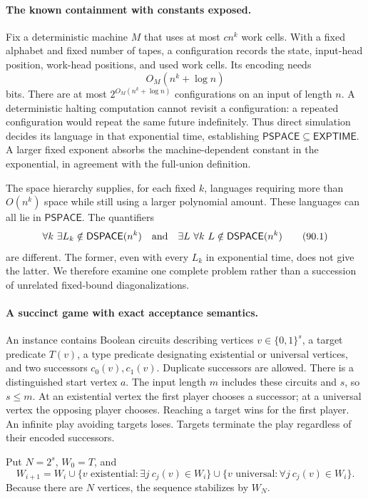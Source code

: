 \documentclass[11pt]{article}
\begin{document}
\paragraph{The known containment with constants exposed.}
Fix a deterministic machine $M$ that uses at most $c n^k$ work cells. With a fixed alphabet and fixed number of tapes, a configuration records the state, input-head position, work-head positions, and used work cells. Its encoding needs
\[
 O_M(n^k+\log n)
\]
bits. There are at most $2^{O_M(n^k+\log n)}$ configurations on an input of length $n$. A deterministic halting computation cannot revisit a configuration: a repeated configuration would repeat the same future indefinitely. Thus direct simulation decides its language in that exponential time, establishing $\mathsf{PSPACE}\subseteq\mathsf{EXPTIME}$. A larger fixed exponent absorbs the machine-dependent constant in the exponential, in agreement with the full-union definition.

The space hierarchy supplies, for each fixed $k$, languages requiring more than $O(n^k)$ space while still using a larger polynomial amount. These languages can all lie in $\mathsf{PSPACE}$. The quantifiers
\[
 \forall k\ \exists L_k\notin\mathsf{DSPACE}(n^k)
 \quad\hbox{and}\quad
 \exists L\ \forall k\ L\notin\mathsf{DSPACE}(n^k)
 \tag{90.1}
\]
are different. The former, even with every $L_k$ in exponential time, does not give the latter. We therefore examine one complete problem rather than a succession of unrelated fixed-bound diagonalizations.

\paragraph{A succinct game with exact acceptance semantics.}
An instance contains Boolean circuits describing vertices $v\in\{0,1\}^s$, a target predicate $T(v)$, a type predicate designating existential or universal vertices, and two successors $c_0(v),c_1(v)$. Duplicate successors are allowed. There is a distinguished start vertex $a$. The input length $m$ includes these circuits and $s$, so $s\le m$. At an existential vertex the first player chooses a successor; at a universal vertex the opposing player chooses. Reaching a target wins for the first player. An infinite play avoiding targets loses. Targets terminate the play regardless of their encoded successors.

Put $N=2^s$, $W_0=T$, and
\[
 W_{i+1}=W_i\cup
 \{v\text{ existential}:\exists j\ c_j(v)\in W_i\}
 \cup
 \{v\text{ universal}:\forall j\ c_j(v)\in W_i\}.
 \tag{90.2}
\]
Because there are $N$ vertices, the sequence stabilizes by $W_N$.
\end{document}
